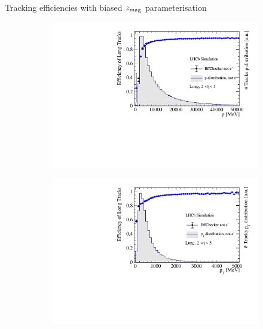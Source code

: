 \documentclass[xcolor={dvipsnames}]{beamer}
\begin{document}
\begin{frame}{Tracking efficiencies with biased $z_{\rm mag}$ parameterisation}
  \vspace{0.0cm}
  \begin{figure}[htb]
    \centering
    \begin{subfigure}{0.45\textwidth}
      \includegraphics[width=1\textwidth]{Plots/TrackEfficiency_p_official_MC_new_parameterisation_bias_comparison.pdf}
    \end{subfigure}%
    \begin{subfigure}{0.45\textwidth}
      \includegraphics[width=1\textwidth]{Plots/TrackEfficiency_pt_official_MC_new_parameterisation_bias_comparison.pdf}
    \end{subfigure}
    \begin{subfigure}{0.45\textwidth}

\end{subfigure}
\end{figure}
\end{frame}
\end{document}
